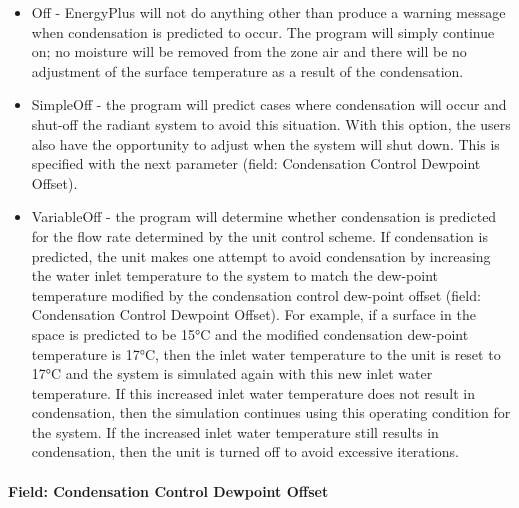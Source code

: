 \begin{itemize}
\item
  Off - EnergyPlus will not do anything other than produce a warning message when condensation is predicted to occur. The program will simply continue on; no moisture will be removed from the zone air and there will be no adjustment of the surface temperature as a result of the condensation.
\item
  SimpleOff - the program will predict cases where condensation will occur and shut-off the radiant system to avoid this situation. With this option, the users also have the opportunity to adjust when the system will shut down. This is specified with the next parameter (field: Condensation Control Dewpoint Offset).
\item
  VariableOff - the program will determine whether condensation is predicted for the flow rate determined by the unit control scheme.  If condensation is predicted, the unit makes one attempt to avoid condensation by increasing the water inlet temperature to the system to match the dew-point temperature modified by the condensation control dew-point offset (field: Condensation Control Dewpoint Offset). For example, if a surface in the space is predicted to be 15°C and the modified condensation dew-point temperature is 17°C, then the inlet water temperature to the unit is reset to 17°C and the system is simulated again with this new inlet water temperature.  If this increased inlet water temperature does not result in condensation, then the simulation continues using this operating condition for the system.  If the increased inlet water temperature still results in condensation, then the unit is turned off to avoid excessive iterations.
\end{itemize}

\paragraph{Field: Condensation Control Dewpoint Offset}\label{field-condensation-control-dewpoint-offset-1}

